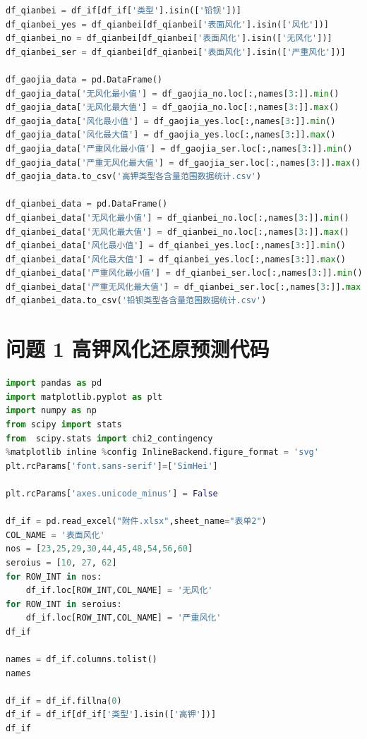 \documentclass[withoutpreface,bwprint]{cumcmthesis} %
\begin{document}
\begin{appendices}
\begin{lstlisting}[language=Python]
df_qianbei = df_if[df_if['类型'].isin(['铅钡'])]
df_qianbei_yes = df_qianbei[df_qianbei['表面风化'].isin(['风化'])]
df_qianbei_no = df_qianbei[df_qianbei['表面风化'].isin(['无风化'])]
df_qianbei_ser = df_qianbei[df_qianbei['表面风化'].isin(['严重风化'])]

df_gaojia_data = pd.DataFrame()
df_gaojia_data['无风化最小值'] = df_gaojia_no.loc[:,names[3:]].min()
df_gaojia_data['无风化最大值'] = df_gaojia_no.loc[:,names[3:]].max()
df_gaojia_data['风化最小值'] = df_gaojia_yes.loc[:,names[3:]].min()
df_gaojia_data['风化最大值'] = df_gaojia_yes.loc[:,names[3:]].max()
df_gaojia_data['严重风化最小值'] = df_gaojia_ser.loc[:,names[3:]].min()
df_gaojia_data['严重无风化最大值'] = df_gaojia_ser.loc[:,names[3:]].max()
df_gaojia_data.to_csv('高钾类型各含量范围数据统计.csv')

df_qianbei_data = pd.DataFrame()
df_qianbei_data['无风化最小值'] = df_qianbei_no.loc[:,names[3:]].min()
df_qianbei_data['无风化最大值'] = df_qianbei_no.loc[:,names[3:]].max()
df_qianbei_data['风化最小值'] = df_qianbei_yes.loc[:,names[3:]].min()
df_qianbei_data['风化最大值'] = df_qianbei_yes.loc[:,names[3:]].max()
df_qianbei_data['严重风化最小值'] = df_qianbei_ser.loc[:,names[3:]].min()
df_qianbei_data['严重无风化最大值'] = df_qianbei_ser.loc[:,names[3:]].max()
df_qianbei_data.to_csv('铅钡类型各含量范围数据统计.csv')
\end{lstlisting}

\section{问题 1 高钾风化还原预测代码}
\begin{lstlisting}[language=Python]
import pandas as pd 
import matplotlib.pyplot as plt
import numpy as np
from scipy import stats
from  scipy.stats import chi2_contingency
%matplotlib inline %config InlineBackend.figure_format = 'svg'
plt.rcParams['font.sans-serif']=['SimHei']

plt.rcParams['axes.unicode_minus'] = False

df_if = pd.read_excel("附件.xlsx",sheet_name="表单2")
COL_NAME = '表面风化'
nos = [23,25,29,30,44,45,48,54,56,60]
seroius = [10, 27, 62]
for ROW_INT in nos:
    df_if.loc[ROW_INT,COL_NAME] = '无风化'
for ROW_INT in seroius:
    df_if.loc[ROW_INT,COL_NAME] = '严重风化'
df_if    

names = df_if.columns.tolist()
names

df_if = df_if.fillna(0)
df_if = df_if[df_if['类型'].isin(['高钾'])]
df_if


\end{lstlisting}
\end{appendices}
\end{document}
